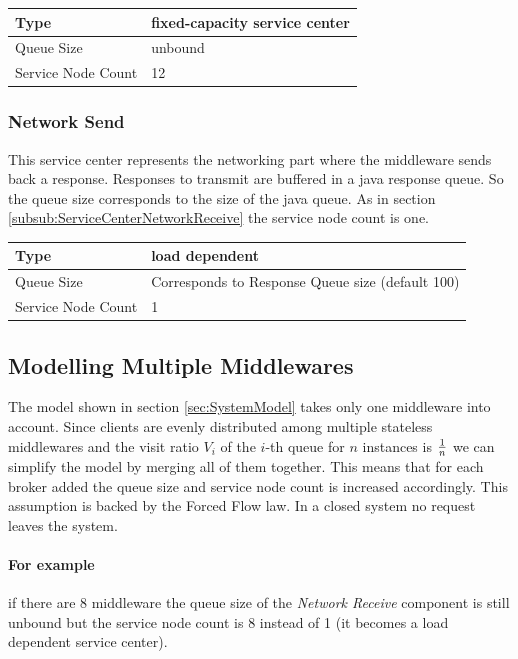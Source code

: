 \documentclass[a4paper]{article}
\begin{document}
\begin{tabular}{|l|l|}
\hline 
Type & fixed-capacity service center \\ 
\hline 
Queue Size & unbound \\ 
\hline 
Service Node Count & 12 \\ 
\hline 
\end{tabular} 


\subsubsection{Network Send}
This service center represents the networking part where the middleware sends back a response. Responses to transmit are buffered in a java response queue. So the queue size corresponds to the size of the java queue. As in section  \ref{subsub:ServiceCenterNetworkReceive} the service node count is one. \\

\begin{tabular}{|l|l|}
\hline 
Type & load dependent \\ 
\hline 
Queue Size & Corresponds to Response Queue size (default 100)\\ 
\hline 
Service Node Count & 1 \\ 
\hline 
\end{tabular} 

\subsection{Modelling Multiple Middlewares}

The model shown in section \ref{sec:SystemModel} takes only one middleware into account. Since clients are evenly distributed among multiple stateless middlewares and the visit ratio $V_i$ of the $i$-th queue for $n$ instances is $1 \over n$ we can simplify the model by merging all of them together. This means that for each broker added the queue size and service node count is increased accordingly. This assumption is backed by the Forced Flow law. In a closed system no request leaves the system.

\paragraph{For example} if there are 8 middleware the queue size of the \textit{Network Receive} component is still unbound but the service node count is 8 instead of 1 (it becomes a load dependent service center).
\end{document}
